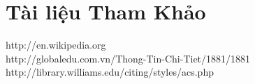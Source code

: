 \documentclass{hcmutarticle}
\begin{document}
\section{Tài liệu Tham Khảo }





http://en.wikipedia.org\\
http://globaledu.com.vn/Thong-Tin-Chi-Tiet/1881/1881\\
http://library.williams.edu/citing/styles/acs.php\\

\end{document}
